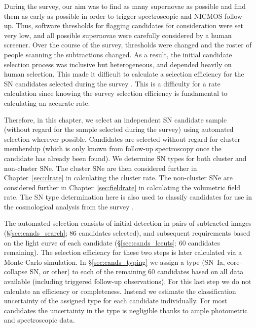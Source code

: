 
During the survey, our aim was to find as many supernovae as possible
and find them as early as possible in order to trigger spectroscopic
and NICMOS follow-up. Thus, software thresholds for flagging
candidates for consideration were set very low, and all possible
supernovae were carefully considered by a human screener. Over the
course of the survey, thresholds were changed and the roster of people
scanning the subtractions changed. As a result, the initial candidate
selection process was inclusive but heterogeneous, and depended
heavily on human selection. This made it difficult to calculate a
selection efficiency for the SN candidates selected during the
survey \citep[listed in Tables~3 and 4 of][]{dawson09a}. This is a
difficulty for a rate calculation since knowing the survey selection
efficiency is fundamental to calculating an accurate rate.

Therefore, in this chapter, we select an independent SN candidate sample
(without regard for the sample selected during the survey) using
automated selection wherever possible. Candidates are selected without
regard for cluster membership (which is only known from follow-up
spectroscopy once the candidate has already been found). We
determine SN types for both cluster and non-cluster SNe. The cluster
SNe are then considered further in Chapter~\ref{sec:clrate} in
calculating the cluster rate. The non-cluster SNe are considered
further in Chapter~\ref{sec:fieldrate} in calculating the volumetric
field rate.  The SN type determination here is also used to classify
candidates for use in the cosmological analysis from the
survey \citep{suzuki11a}.

The automated selection consists of initial detection in pairs of
subtracted images (\S\ref{sec:cands_search}; 86 candidates selected),
and subsequent requirements based on the light curve of each candidate
(\S\ref{sec:cands_lccuts}; 60 candidates remaining). The selection
efficiency for these two steps is later calculated via a Monte Carlo
simulation. In \S\ref{sec:cands_typing} we assign a type (SN~Ia,
core-collapse SN, or other) to each of the remaining 60 candidates
based on all data available (including triggered follow-up
observations). For this last step we do not calculate an efficiency or
completeness. Instead we estimate the classification uncertainty of
the assigned type for each candidate individually. For most candidates
the uncertainty in the type is negligible thanks to ample photometric
and spectroscopic data.
